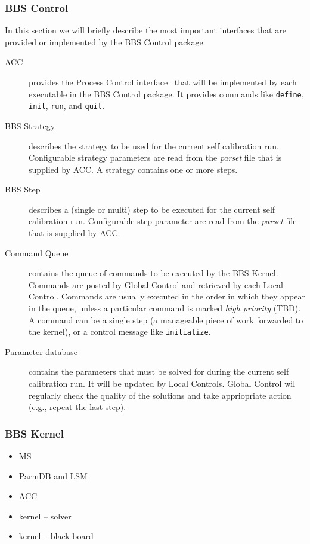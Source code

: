\documentclass[10pt]{lofar}
\begin{document}
\subsubsection{BBS Control}
\label{subsubsec:interf-control}
In this section we will briefly describe the most important interfaces that are provided or implemented by the BBS Control package. 
\begin{description}
\item [ACC] provides the Process Control interface~\cite{LOFAR-ASTRON-SDD-037} that will be implemented by each executable in the BBS Control package. It provides commands like \texttt{define}, \texttt{init}, \texttt{run}, and \texttt{quit}.
\item [BBS Strategy] describes the strategy to be used for the current self calibration run. Configurable strategy parameters are read from the \emph{parset} file that is supplied by ACC. A strategy contains one or more steps.
\item [BBS Step] describes a (single or multi) step to be executed for the current self calibration run. Configurable step parameter are read from the \emph{parset} file that is supplied by ACC.
\item [Command Queue] contains the queue of commands to be executed by the BBS Kernel. Commands are posted by Global Control and retrieved by each Local Control. Commands are usually executed in the order in which they appear in the queue, unless a particular command is marked \emph{high priority} (TBD). A command can be a single step (a manageable piece of work forwarded to the kernel), or a control message like \texttt{initialize}.
\item [Parameter database] contains the parameters that must be solved for during the current self calibration run. It will be updated by Local Controls. Global Control wil regularly check the quality of the solutions and take appriopriate action (e.g., repeat the last step).
\end{description}



\subsubsection{BBS Kernel}
\label{subsubsec:interf-kernel}

\begin{itemize}
\item MS
\item ParmDB and LSM
\item ACC
\item kernel -- solver
\item kernel -- black board
\end{itemize}
\end{document}
